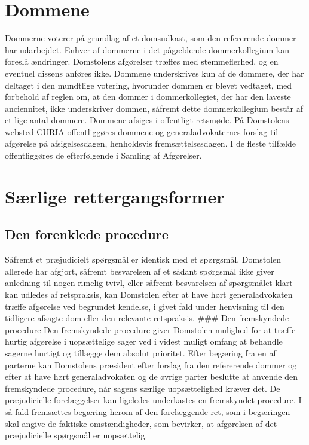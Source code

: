 \documentclass[]{book}
\begin{document}
\hypertarget{dommene}{%
\section{Dommene}\label{dommene}}

Dommerne voterer på grundlag af et domsudkast, som den refererende dommer har udarbejdet. Enhver af dommerne i det pågældende dommerkollegium kan foreslå ændringer. Domstolens afgørelser træffes med stemmeflerhed, og en eventuel dissens anføres ikke. Dommene underskrives kun af de dommere, der har deltaget i den mundtlige votering, hvorunder dommen er blevet vedtaget, med forbehold af reglen om, at den dommer i dommerkollegiet, der har den laveste anciennitet, ikke underskriver dommen, såfremt dette dommerkollegium består af et lige antal dommere. Dommene afsiges i offentligt retsmøde. På Domstolens websted CURIA offentliggøres dommene og generaladvokaternes forslag til afgørelse på afsigelsesdagen, henholdsvis fremsættelsesdagen. I de fleste tilfælde offentliggøres de efterfølgende i Samling af Afgørelser.

\hypertarget{srlige-rettergangsformer}{%
\section{Særlige rettergangsformer}\label{srlige-rettergangsformer}}

\hypertarget{den-forenklede-procedure}{%
\subsection{Den forenklede procedure}\label{den-forenklede-procedure}}

Såfremt et præjudicielt spørgsmål er identisk med et spørgsmål, Domstolen allerede har afgjort, såfremt besvarelsen af et sådant spørgsmål ikke giver anledning til nogen rimelig tvivl, eller såfremt besvarelsen af spørgsmålet klart kan udledes af retspraksis, kan Domstolen efter at have hørt generaladvokaten træffe afgørelse ved begrundet kendelse, i givet fald under henvisning til den tidligere afsagte dom eller den relevante retspraksis.
\#\#\# Den fremskyndede procedure
Den fremskyndede procedure giver Domstolen mulighed for at træffe hurtig afgørelse i uopsættelige sager ved i videst muligt omfang at behandle sagerne hurtigt og tillægge dem absolut prioritet. Efter begæring fra en af parterne kan Domstolens præsident efter forslag fra den refererende dommer og efter at have hørt generaladvokaten og de øvrige parter beslutte at anvende den fremskyndede procedure, når sagens særlige uopsættelighed kræver det. De præjudicielle forelæggelser kan ligeledes underkastes en fremskyndet procedure. I så fald fremsættes begæring herom af den forelæggende ret, som i begæringen skal angive de faktiske omstændigheder, som bevirker, at afgørelsen af det præjudicielle spørgsmål er uopsættelig.
\end{document}
